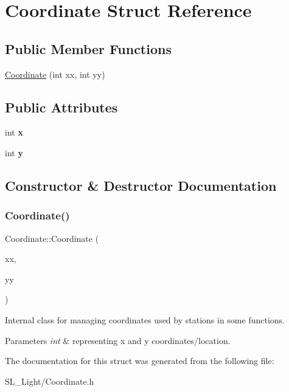 \hypertarget{struct_coordinate}{}\section{Coordinate Struct Reference}
\label{struct_coordinate}
\subsection*{Public Member Functions}
\begin{DoxyCompactItemize}
\item 
\mbox{\hyperlink{struct_coordinate_a8eb04ecf1586f9673ccdb44f6c6111c1}{Coordinate}} (int xx, int yy)
\end{DoxyCompactItemize}
\subsection*{Public Attributes}
\begin{DoxyCompactItemize}
\item 
\mbox{\label{struct_coordinate_ad462d671f1feb865911333e3ff5f0a5d}} 
int {\bfseries x}
\item 
\mbox{\label{struct_coordinate_a5c7d59f0f65ff9371b6c3791f78880aa}} 
int {\bfseries y}
\end{DoxyCompactItemize}


\subsection{Constructor \& Destructor Documentation}
\mbox{\label{struct_coordinate_a8eb04ecf1586f9673ccdb44f6c6111c1}} 
\subsubsection{\texorpdfstring{Coordinate()}{Coordinate()}}
{\footnotesize\ttfamily Coordinate\+::\+Coordinate (\begin{DoxyParamCaption}\item[{int}]{xx,  }\item[{int}]{yy }\end{DoxyParamCaption})\hspace{0.3cm}{\ttfamily [inline]}}

Internal class for managing coordinates used by stations in some functions.


\begin{DoxyParams}{Parameters}
{\em int} & representing x and y coordinates/location. \\
\hline
\end{DoxyParams}


The documentation for this struct was generated from the following file\+:\begin{DoxyCompactItemize}
\item 
S\+L\+\_\+\+Light/Coordinate.\+h\end{DoxyCompactItemize}
